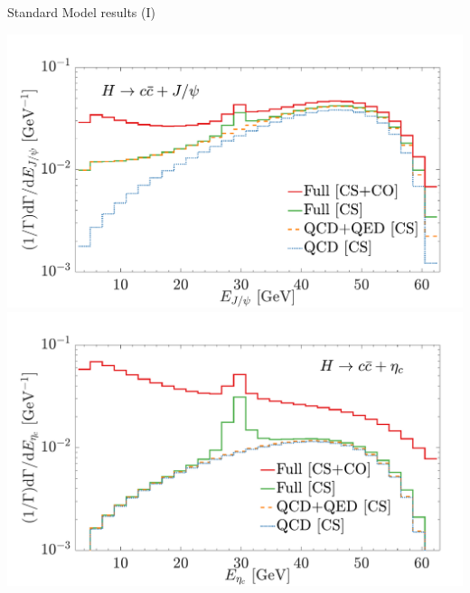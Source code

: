 \documentclass[aspectratio=169]{beamer}
\begin{document}
\begin{frame}{Standard Model results (I)}
	\vspace{-2mm}
	\begin{center}
		\includegraphics[width=.4\textwidth]{figs/dGmdEJpsiSM_Norm.pdf}
		\includegraphics[width=.4\textwidth]{figs/dGmdEetaSM_Norm.pdf}
	\end{center}
\end{frame}
\end{document}
